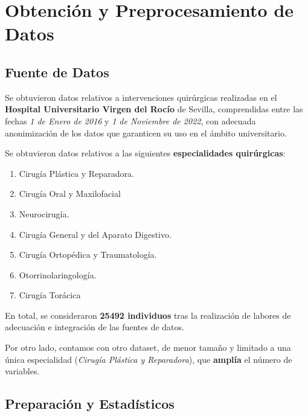 
\section{Obtención y Preprocesamiento de Datos}

\subsection{Fuente de Datos}

Se obtuvieron datos relativos a intervenciones quirúrgicas realizadas en el \textbf{Hospital Universitario Virgen del Rocío} de Sevilla, comprendidas entre las fechas \textit{1 de Enero de 2016} y \textit{1 de Noviembre de 2022}, con adecuada anonimización de los datos que garanticen su uso en el ámbito universitario.

Se obtuvieron datos relativos a las siguientes \textbf{especialidades quirúrgicas}:
\begin{enumerate}
    \item Cirugía Plástica y Reparadora.
    \item Cirugía Oral y Maxilofacial
    \item Neurocirugía.
    \item Cirugía General y del Aparato Digestivo.
    \item Cirugía Ortopédica y Traumatología.
    \item Otorrinolaringología.
    \item Cirugía Torácica
\end{enumerate}


En total, se consideraron \textbf{25492 individuos} tras la realización de labores de adecuación e integración de las fuentes de datos.


Por otro lado, contamos con otro dataset, de menor tamaño y limitado a una única especialidad (\textit{Cirugía Plástica y Reparadora}), que \textbf{amplía} el número de variables.
 


 \subsection{Preparación y Estadísticos}

